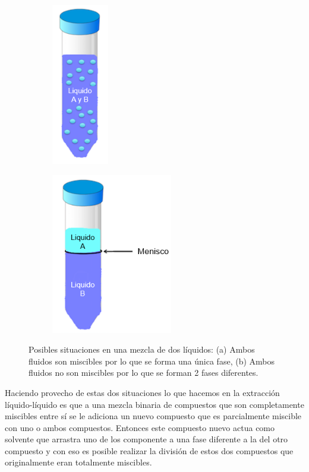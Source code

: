\documentclass[11pt]{book}
\begin{document}
\begin{figure}[H]
  \begin{subfigure}[b]{0.45\textwidth}
    \centering
    \includegraphics[width=2.5cm]{img/LiquidoLiquido/MezclaLiquidoLiquido_1.PNG}
    \caption{ }
    \label{fig:Mezcla_LiquidoLiquido_1}
  \end{subfigure}
  \hfill
  \begin{subfigure}[b]{0.45\textwidth}
    \centering
    \includegraphics[width=5.3cm]{img/LiquidoLiquido/MezclaLiquidoLiquido_2.PNG}
    \caption{ }
    \label{fig:Mezcla_LiquidoLiquido_2}
  \end{subfigure}
  \caption{Posibles situaciones en una mezcla de dos líquidos: (a) Ambos fluidos son miscibles por lo que se forma una única fase, (b) Ambos fluidos no son miscibles por lo que se forman 2 fases diferentes.}
  \label{fig:MezclaLiquidoLiquido}
\end{figure}

Haciendo provecho de estas dos situaciones lo que hacemos en la extracción líquido-líquido es que a una mezcla binaria de compuestos que son completamente miscibles entre sí se le adiciona un nuevo compuesto que es parcialmente miscible con uno o ambos compuestos. Entonces este compuesto nuevo actua como solvente que arrastra uno de los componente a una fase diferente a la del otro compuesto y con eso es posible realizar la división de estos dos compuestos que originalmente eran totalmente miscibles.
\end{document}
